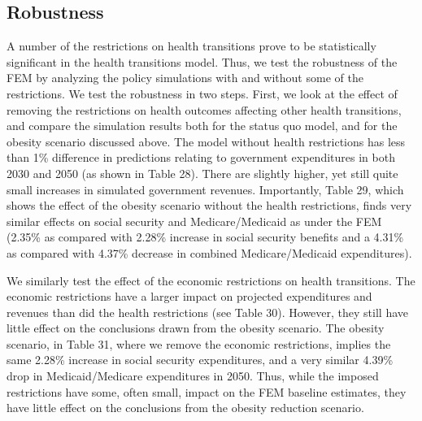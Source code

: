 \subsection{Robustness}
\label{sec:robustness}
A number of the restrictions on health transitions prove to be statistically significant in the health transitions model. 
Thus, we test the robustness of the FEM by analyzing the policy simulations with and without 
some of the restrictions. We test the robustness in two steps. First, we look at the effect of removing the restrictions on health outcomes 
affecting other health transitions, and compare the simulation results both for the status quo model, and for the obesity scenario discussed 
above. The model without health restrictions has less than 1\% difference in predictions relating to government expenditures in both 2030 
and 2050 (as shown in Table 28). There are slightly higher, yet still quite small increases in simulated government revenues.  Importantly, Table 29, which shows the effect 
of the obesity scenario without the health restrictions, finds very similar effects on social security and Medicare/Medicaid as under the 
FEM (2.35\% as compared with 2.28\% increase in social security benefits and a 4.31\% as compared with 4.37\% decrease in combined 
Medicare/Medicaid expenditures). 

We similarly test the effect of the economic restrictions on health transitions. The economic restrictions have a larger impact on 
projected expenditures and revenues than did the health restrictions (see Table 30). However, they still have little effect on the 
conclusions drawn from the obesity scenario. The obesity scenario, in Table 31, where we remove the economic restrictions, implies the same 
2.28\% increase in social security expenditures, and a very similar 4.39\% drop in Medicaid/Medicare expenditures in 2050. Thus, while the 
imposed restrictions have some, often small, impact on the FEM baseline estimates, they have little effect on the conclusions from the 
obesity reduction scenario.

